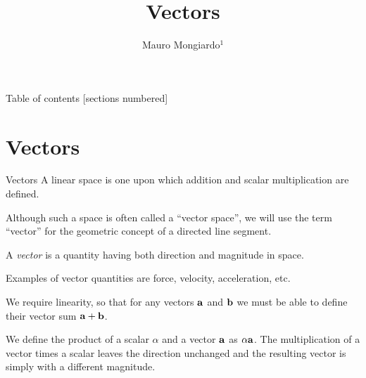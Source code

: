 \documentclass[10pt]{beamer}
\title{Vectors}
\date{}
\author{ Mauro Mongiardo$^1$}
\institute{ $^1$ Department of Engineering, University of Perugia, Perugia, Italy.
}
\begin{document}
\maketitle

\begin{frame}{Table of contents}
  [sections numbered]
  \tableofcontents[hideallsubsections]
\end{frame}


\def\EMspectrum{\centering
\texttt{[image: EMspectrum]}}

\def\atmatt{\centering
\texttt{[image: atmatt3.eps]}}


%



\section{Vectors}


\begin{frame}[fragile]{Vectors}
%
A \alert{linear space} is one upon which addition and scalar multiplication are defined. 

Although such a space is often called a ``vector space'', we will use the term \alert{``vector'' for the geometric concept of a directed line segment}. 

A \alert{\emph{vector}} is a quantity having both \alert{direction and magnitude} in space. 

Examples of vector quantities are force, velocity, acceleration, etc.

We require \alert{linearity}, so that for any vectors $\bf a$ and $\bf b$ we must be able to define their vector sum $ \bf a + b$. 

We define \alert{the product of a scalar $\alpha$ and a vector  $\bf a$} as $\alpha {\bf a}$. The multiplication of a vector times a scalar leaves the direction unchanged and the resulting vector is simply with a different magnitude.


\end{frame}
\end{document}
